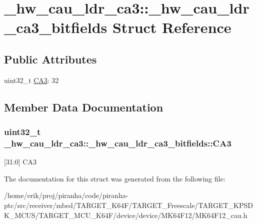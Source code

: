 \hypertarget{struct__hw__cau__ldr__ca3_1_1__hw__cau__ldr__ca3__bitfields}{}\section{\+\_\+hw\+\_\+cau\+\_\+ldr\+\_\+ca3\+:\+:\+\_\+hw\+\_\+cau\+\_\+ldr\+\_\+ca3\+\_\+bitfields Struct Reference}
\label{struct__hw__cau__ldr__ca3_1_1__hw__cau__ldr__ca3__bitfields}
\subsection*{Public Attributes}
\begin{DoxyCompactItemize}
\item 
uint32\+\_\+t \hyperlink{struct__hw__cau__ldr__ca3_1_1__hw__cau__ldr__ca3__bitfields_a35824bf16e180209ab95bd78b8a1050e}{C\+A3}\+: 32
\end{DoxyCompactItemize}


\subsection{Member Data Documentation}
\subsubsection[{\texorpdfstring{C\+A3}{CA3}}]{\setlength{\rightskip}{0pt plus 5cm}uint32\+\_\+t \+\_\+hw\+\_\+cau\+\_\+ldr\+\_\+ca3\+::\+\_\+hw\+\_\+cau\+\_\+ldr\+\_\+ca3\+\_\+bitfields\+::\+C\+A3}\hypertarget{struct__hw__cau__ldr__ca3_1_1__hw__cau__ldr__ca3__bitfields_a35824bf16e180209ab95bd78b8a1050e}{}\label{struct__hw__cau__ldr__ca3_1_1__hw__cau__ldr__ca3__bitfields_a35824bf16e180209ab95bd78b8a1050e}
\mbox{[}31\+:0\mbox{]} C\+A3 

The documentation for this struct was generated from the following file\+:\begin{DoxyCompactItemize}
\item 
/home/erik/proj/piranha/code/piranha-\/ptc/src/receiver/mbed/\+T\+A\+R\+G\+E\+T\+\_\+\+K64\+F/\+T\+A\+R\+G\+E\+T\+\_\+\+Freescale/\+T\+A\+R\+G\+E\+T\+\_\+\+K\+P\+S\+D\+K\+\_\+\+M\+C\+U\+S/\+T\+A\+R\+G\+E\+T\+\_\+\+M\+C\+U\+\_\+\+K64\+F/device/device/\+M\+K64\+F12/M\+K64\+F12\+\_\+cau.\+h\end{DoxyCompactItemize}
